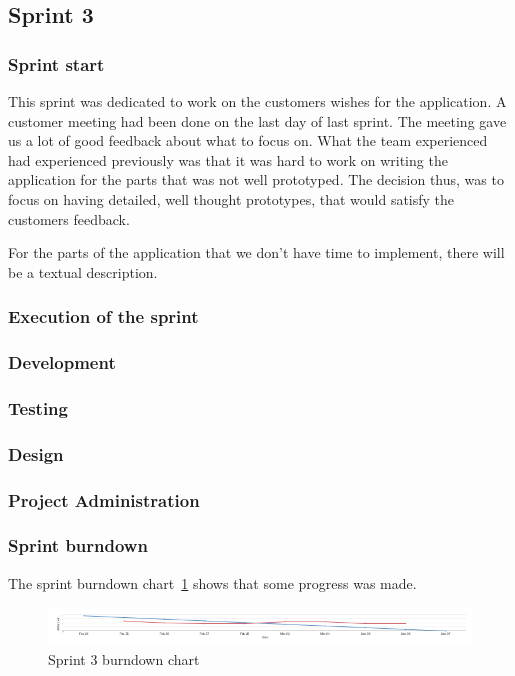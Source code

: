 \subsection{Sprint 3}
\subsubsection{Sprint start}
This sprint was dedicated to work on the customers wishes for the application. A customer meeting had been done on the last day of last sprint. The meeting gave us a lot of good feedback about what to focus on.
What the team experienced had experienced previously was that it was hard to work on writing the application for the parts that was not well prototyped.
The decision thus, was to focus on having detailed, well thought prototypes, that would satisfy the customers feedback. 

For the parts of the application that we don't have time to implement, there will be a textual description.


\subsubsection{Execution of the sprint}
\subsubsection{Development}
\subsubsection{Testing}
\subsubsection{Design}
\subsubsection{Project Administration}

\subsubsection{Sprint burndown}

The sprint burndown chart~\ref{fig:sprint3burndown} shows that some progress was made.

\begin{figure}[H]
\includegraphics[width=\textwidth]{ch/projectManagement/fig/sprint3burndown.png}
\caption{Sprint 3 burndown chart}
\label{fig:sprint3burndown}
\end{figure}

